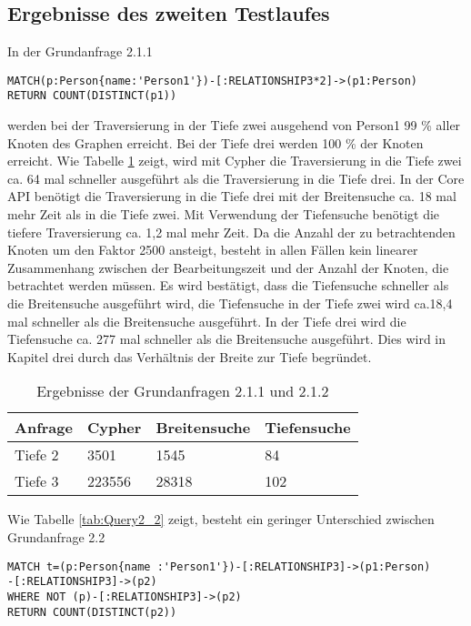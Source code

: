 \subsection{Ergebnisse des zweiten Testlaufes}
In der Grundanfrage 2.1.1
\begin{Verbatim}[frame=single]
MATCH(p:Person{name:'Person1'})-[:RELATIONSHIP3*2]->(p1:Person) 
RETURN COUNT(DISTINCT(p1))
\end{Verbatim}
 werden bei der Traversierung in der Tiefe zwei ausgehend von Person1 99 \% aller Knoten des Graphen erreicht. Bei der Tiefe drei werden 100 \% der Knoten erreicht. Wie Tabelle \ref{tab:Query2_1} zeigt, wird mit Cypher die Traversierung in die Tiefe zwei ca. 64 mal schneller ausgeführt als die Traversierung in die Tiefe drei. In der Core API benötigt die Traversierung in die Tiefe drei mit der Breitensuche ca. 18 mal mehr Zeit als in die Tiefe zwei. Mit Verwendung der Tiefensuche benötigt die tiefere Traversierung ca. 1,2 mal mehr Zeit. Da die Anzahl der zu betrachtenden Knoten um den Faktor 2500 ansteigt, besteht in allen Fällen kein linearer Zusammenhang zwischen der Bearbeitungszeit und der Anzahl der Knoten, die betrachtet werden müssen. \newline 
Es wird bestätigt, dass die Tiefensuche schneller als die Breitensuche ausgeführt wird, die Tiefensuche in der Tiefe zwei wird ca.18,4 mal schneller als die Breitensuche ausgeführt. In der Tiefe drei wird die Tiefensuche ca. 277 mal schneller als die Breitensuche ausgeführt. Dies wird in Kapitel drei durch das Verhältnis der Breite zur Tiefe begründet. 
\FloatBarrier
\begin{table}[h]
\centering
		\begin{tabular}{ |p{3cm}||p{3cm}|p{3cm}|p{3cm}|  }
			\hline
			Anfrage& Cypher & Breitensuche&Tiefensuche\\
			\hline
			Tiefe 2   & 3501    & 1545&   84\\
			Tiefe 3&    223556  & 28318   & 102\\
			\hline
		\end{tabular}
		\caption{Ergebnisse der Grundanfragen 2.1.1 und 2.1.2}
		\label{tab:Query2_1}
\end{table}
\FloatBarrier
\noindent Wie Tabelle \ref{tab:Query2_2} zeigt, besteht ein geringer Unterschied zwischen Grundanfrage 2.2
\begin{Verbatim}[frame=single]
MATCH t=(p:Person{name :'Person1'})-[:RELATIONSHIP3]->(p1:Person)
-[:RELATIONSHIP3]->(p2)
WHERE NOT (p)-[:RELATIONSHIP3]->(p2) 
RETURN COUNT(DISTINCT(p2))
\end{Verbatim} 
